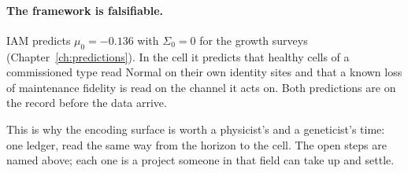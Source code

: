 \paragraph{The framework is falsifiable.} IAM predicts $\mu_0=-0.136$ with $\Sigma_0=0$ for the growth surveys (Chapter~\ref{ch:predictions}). In the
cell it predicts that healthy cells of a commissioned type read Normal on their own identity sites and that a known loss of maintenance fidelity is
read on the channel it acts on. Both predictions are on the record before the data arrive. \prediction

This is why the encoding surface is worth a physicist's and a geneticist's time: one ledger, read the same way from the horizon to the cell. The open steps are named above; each one is a project someone in that field can take up and settle.
